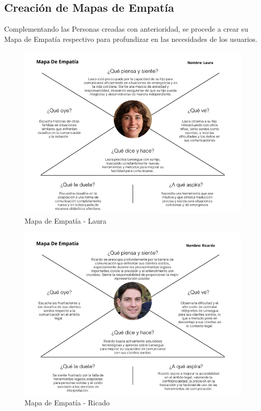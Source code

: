

\subsection{Creación de Mapas de Empatía}

Complementando las Personas creadas con anterioridad, se procede a crear su Mapa de Empatía respectivo para profundizar en las necesidades de los usuarios. 

\begin{figure} [H]
    \centering
    \includegraphics[width=0.9\linewidth]{figuras/mapa_empatia_laura.png}
    \caption{Mapa de Empatía - Laura}
    \label{fig:enter-label}
\end{figure}

\begin{figure} [H]
    \centering
    \includegraphics[width=0.9\linewidth]{figuras/mapa_empatia_ricardo.png}
    \caption{Mapa de Empatía - Ricado}
    \label{fig:enter-label}
\end{figure}

